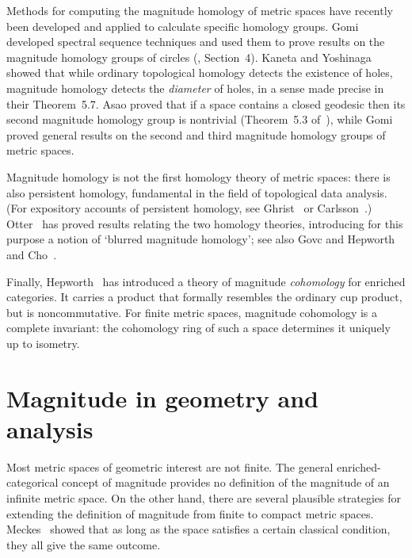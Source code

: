Methods for computing the magnitude homology of metric spaces have recently
been developed and applied to calculate specific homology groups.  Gomi
developed spectral sequence techniques and used them to prove results on
the magnitude homology groups of circles (\cite{GomiSFM}, Section~4).
Kaneta and Yoshinaga~\cite{KaYo} showed that while ordinary topological
homology detects the existence of holes, magnitude homology detects the
\emph{diameter} of holes, in a sense made precise in their Theorem~5.7.
Asao proved that if a space contains a closed geodesic then its second
magnitude homology group is nontrivial (Theorem~5.3 of~\cite{Asao}), while
Gomi~\cite{GomiMHG} proved general results on the second and third
magnitude homology groups of metric spaces.

Magnitude homology is not the first homology theory of metric spaces: there
is also persistent%
%
%
homology, fundamental in the field of topological data analysis.  (For
expository accounts of persistent homology, see Ghrist~\cite{GhriBPT} or
Carlsson~\cite{Carl}.)  Otter~\cite{Otte}%
%
% 
has proved results relating the two homology theories, introducing for this
purpose a notion of `blurred magnitude homology'; see also Govc and
Hepworth~\cite{GoHe} and Cho~\cite{Cho}.

Finally, Hepworth~\cite{HepwMC} has introduced a theory of magnitude
\emph{cohomology}%
%
%
%
for enriched categories.  It carries a product that formally resembles the
ordinary cup product, but is noncommutative.  For finite metric spaces,
magnitude cohomology is a complete invariant: the cohomology ring
of such a space determines it uniquely up to isometry.



\section{Magnitude in geometry and analysis}


Most metric spaces of geometric interest are not finite.  The general
enriched-categorical concept of magnitude provides no definition of the
magnitude of an infinite metric space.  On the other hand, there are 
several plausible strategies for extending the definition of magnitude from
finite to compact metric spaces.  Meckes~\cite{MeckPDM,MeckMDC}%
% 
% 
showed that as long as the space satisfies a certain classical condition,
they all give the same outcome.

